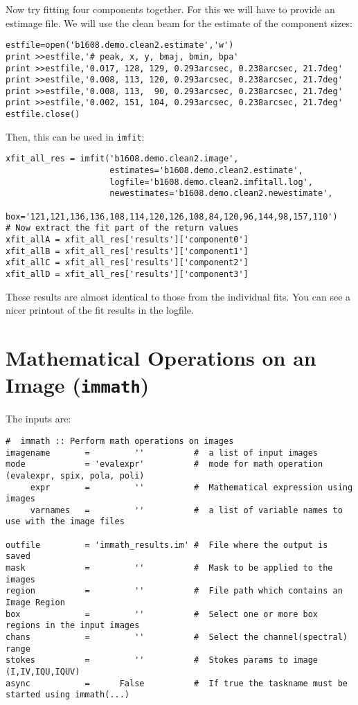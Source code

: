 Now try fitting four components together.  For this we will have to
provide an estimage file.  We will use the clean beam for the estimate
of the component sizes:
\small
\begin{verbatim}
estfile=open('b1608.demo.clean2.estimate','w')
print >>estfile,'# peak, x, y, bmaj, bmin, bpa'
print >>estfile,'0.017, 128, 129, 0.293arcsec, 0.238arcsec, 21.7deg'
print >>estfile,'0.008, 113, 120, 0.293arcsec, 0.238arcsec, 21.7deg'
print >>estfile,'0.008, 113,  90, 0.293arcsec, 0.238arcsec, 21.7deg'
print >>estfile,'0.002, 151, 104, 0.293arcsec, 0.238arcsec, 21.7deg'
estfile.close()
\end{verbatim}
\normalsize
Then, this can be used in {\tt imfit}:
\small
\begin{verbatim}
xfit_all_res = imfit('b1608.demo.clean2.image', 
                     estimates='b1608.demo.clean2.estimate',
                     logfile='b1608.demo.clean2.imfitall.log',
                     newestimates='b1608.demo.clean2.newestimate',
                     box='121,121,136,136,108,114,120,126,108,84,120,96,144,98,157,110')
# Now extract the fit part of the return values
xfit_allA = xfit_all_res['results']['component0']
xfit_allB = xfit_all_res['results']['component1']
xfit_allC = xfit_all_res['results']['component2']
xfit_allD = xfit_all_res['results']['component3']
\end{verbatim}
\normalsize
These results are almost identical to those from the individual fits.
You can see a nicer printout of the fit results in the logfile.

\section{Mathematical Operations on an Image ({\tt immath})}
\label{section:analysis.immath}

The inputs are:
\small
\begin{verbatim}
#  immath :: Perform math operations on images
imagename       =         ''          #  a list of input images
mode            = 'evalexpr'          #  mode for math operation (evalexpr, spix, pola, poli)
     expr       =         ''          #  Mathematical expression using images
     varnames   =         ''          #  a list of variable names to use with the image files

outfile         = 'immath_results.im' #  File where the output is saved
mask            =         ''          #  Mask to be applied to the images
region          =         ''          #  File path which contains an Image Region
box             =         ''          #  Select one or more box regions in the input images
chans           =         ''          #  Select the channel(spectral) range
stokes          =         ''          #  Stokes params to image (I,IV,IQU,IQUV)
async           =      False          #  If true the taskname must be started using immath(...)
\end{verbatim}
\normalsize

